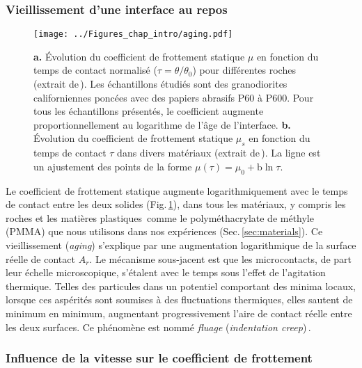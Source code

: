 \subsubsection{Vieillissement d'une interface au repos}
\label{sec:aging}

\begin{figure}[htb]
\centering
\texttt{[image: ../Figures\_chap\_intro/aging.pdf]}
\caption[Vieillissement d'une interface bloquée]{\textbf{a.} Évolution du coefficient de frottement statique $\mu$ en fonction du temps de contact normalisé ($\tau=\theta/\theta_0$) pour différentes roches (extrait de\,\cite{dieterich_modeling_1979}). Les échantillons étudiés sont des granodiorites californiennes poncées avec des papiers abrasifs P60 à P600. Pour tous les échantillons présentés, le coefficient augmente proportionnellement au logarithme de l'âge de l'interface. \textbf{b.} Évolution du coefficient de frottement statique $\mu_s$ en fonction du temps de contact $\tau$ dans divers matériaux (extrait de\,\cite{baumberger_contact_1997}). La ligne est un ajustement des points de la forme $\mu(\tau)=\mu_0+\text{b}\ln\tau$.}
\label{fig:aging}
\end{figure}



Le coefficient de frottement statique augmente logarithmiquement avec le temps de contact entre les deux solides (Fig.\,\ref{fig:aging}), dans tous les matériaux, y compris les roches et les matières plastiques\,\cite{dieterich_modeling_1979,baumberger_contact_1997} comme le polyméthacrylate de méthyle (PMMA) que nous utilisons dans nos expériences (Sec.\,\ref{sec:materials}). Ce vieillissement (\textit{aging}) s'explique par une augmentation logarithmique de la surface réelle de contact $A_r$. Le mécanisme sous-jacent est que les microcontacts, de part leur échelle microscopique, s’étalent avec le temps sous l'effet de l'agitation thermique. Telles des particules dans un potentiel comportant des minima locaux, lorsque ces aspérités sont soumises à des fluctuations thermiques, elles sautent de minimum en minimum, augmentant progressivement l'aire de contact réelle entre les deux surfaces. Ce phénomène est nommé \textit{fluage} (\textit{indentation creep})\,\cite{cocks_indentation_1991,dieterich_direct_1994,baumberger_solid_2006}.



\subsubsection[Influence de la vitesse sur $\mu$]{Influence de la vitesse sur le coefficient de frottement}

